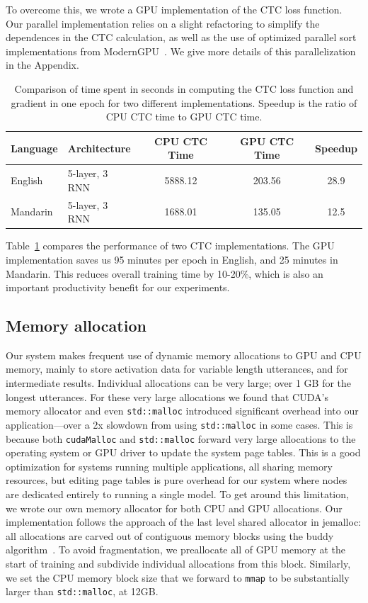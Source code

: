 \documentclass{article}
\begin{document}
To overcome this, we wrote a GPU implementation of the CTC loss function. Our parallel implementation relies on a slight refactoring to simplify the dependences in the CTC calculation, as well as the use of optimized parallel sort implementations from ModernGPU~\cite{ModernGPU}. We give more details of this parallelization in the Appendix.

\begin{table}
\centering
\begin{tabular}{l  l  c  c  c}
\toprule
Language  & Architecture   & CPU CTC Time & GPU CTC Time  & Speedup  \\
\midrule
English   & 5-layer, 3 RNN & 5888.12      & 203.56        & 28.9     \\
Mandarin  & 5-layer, 3 RNN & 1688.01      & 135.05        & 12.5     \\
\bottomrule
\end{tabular}
\caption{Comparison of time spent in seconds in computing the CTC loss function and gradient in one epoch for two different implementations. Speedup is the ratio of CPU CTC time to GPU CTC time.}
\label{table:gpucpuctc}
\end{table}

Table~\ref{table:gpucpuctc} compares the performance of two CTC implementations. The GPU implementation saves us 95 minutes per epoch in English, and 25 minutes in Mandarin. This reduces overall training time by 10-20\%, which is also an important productivity benefit for our experiments.


\subsection{Memory allocation}
Our system makes frequent use of dynamic memory allocations to GPU and CPU memory, mainly to store activation data for variable length utterances, and for intermediate results. Individual allocations can be very large; over 1 GB for the longest utterances.  For these very large allocations we found that CUDA's memory allocator and even \texttt{std::malloc} introduced significant overhead into our application---over a 2x slowdown from using \texttt{std::malloc} in some cases. This is because both \texttt{cudaMalloc} and \texttt{std::malloc} forward very large allocations to the operating system or GPU driver to update the system page tables. This is a good optimization for systems running multiple applications, all sharing memory resources, but editing page tables is pure overhead for our system where nodes are dedicated entirely to running a single model. To get around this limitation, we wrote our own memory allocator for both CPU and GPU allocations. Our implementation follows the approach of the last level shared allocator in jemalloc: all allocations are carved out of contiguous memory blocks using the buddy algorithm~\cite{Knowlton:1965:FSA:365628.365655}. To avoid fragmentation, we preallocate all of GPU memory at the start of training and subdivide individual allocations from this block. Similarly, we set the CPU memory block size that we forward to \texttt{mmap} to be substantially larger than \texttt{std::malloc}, at 12GB.
\end{document}
